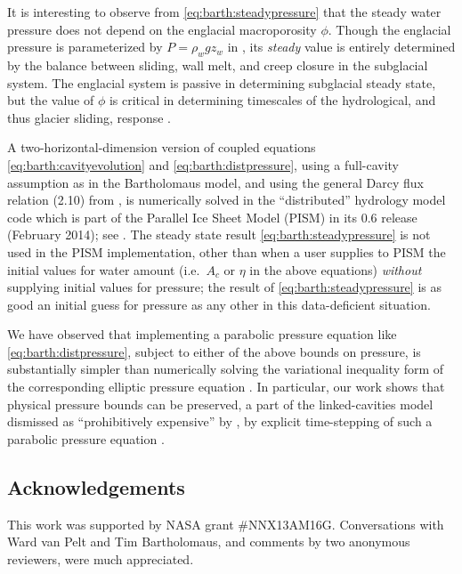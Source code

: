 \documentclass[twocolumn]{igs}
\begin{document}
It is interesting to observe from \eqref{eq:barth:steadypressure} that the steady water pressure does not depend on the englacial macroporosity $\phi$.  Though the englacial pressure is parameterized by $P=\rho_w g z_w$ in \cite{Bartholomausetal2011}, its \emph{steady} value is entirely determined by the balance between sliding, wall melt, and creep closure in the subglacial system.  The englacial system is passive in determining subglacial steady state, but the value of $\phi$ is critical in determining timescales of the hydrological, and thus glacier sliding, response \citep{vanPeltthesis}.

A two-horizontal-dimension version of coupled equations \eqref{eq:barth:cavityevolution} and \eqref{eq:barth:distpressure}, using a full-cavity assumption as in the Bartholomaus model, and using the general Darcy flux relation (2.10) from \cite{Schoofetal2012}, is numerically solved in the ``distributed'' hydrology model code which is part of the Parallel Ice Sheet Model (PISM) in its 0.6 release (February 2014); see \cite{BuelervanPeltDRAFT}.  The steady state result \eqref{eq:barth:steadypressure} is not used in the PISM implementation, other than when a user supplies to PISM the initial values for water amount (i.e.~$A_c$ or $\eta$ in the above equations) \emph{without} supplying initial values for pressure; the result of \eqref{eq:barth:steadypressure} is as good an initial guess for pressure as any other in this data-deficient situation.

We have observed that implementing a parabolic pressure equation like \eqref{eq:barth:distpressure}, subject to either of the above bounds on pressure, is substantially simpler than numerically solving the variational inequality form of the corresponding elliptic pressure equation \citep{Schoofetal2012}.  In particular, our work shows that physical pressure bounds can be preserved, a part of the linked-cavities model dismissed as ``prohibitively expensive'' by \cite{Werderetal2013}, by explicit time-stepping of such a parabolic pressure equation \citep{BuelervanPeltDRAFT}.

\subsection*{Acknowledgements}  This work was supported by NASA grant \#NNX13AM16G.  Conversations with Ward van Pelt and Tim Bartholomaus, and comments by two anonymous reviewers, were much appreciated.

%
%
\end{document}
